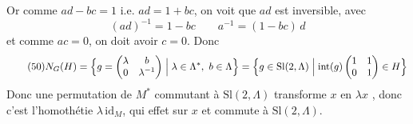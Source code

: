 \documentclass[11pt,a4paper]{article}
\begin{document}
Or  comme $ad-bc=1$ i.e. $ad=1+bc$,
on voit que  $ad$ est inversible,
 avec
\[
(ad)^{-1} = 1-bc \qquad a^{-1} = (1-bc)\,d
\]
et comme $ac=0$, on doit avoir $c=0$.
Donc
\[
\tag{50}
N_G(H) = \Bigl\{ g = \begin{pmatrix} \lambda & b\\ 0 & \lambda^{-1}\end{pmatrix} \Bigm| \lambda\in\Lambda^{*},\ b\in\Lambda \Bigr\}
= \Bigl\{ g\in\mathrm{Sl}(2,\Lambda) \Bigm| \operatorname{int}(g)\begin{pmatrix} 1 & 1\\ 0 & 1\end{pmatrix}\in H \Bigr\}
\]
Donc une \struck{\ill{}} permutation de $M^{*}$
commutant à $\mathrm{Sl}(2,\Lambda)$ transforme $x$ en $\lambda x$ \add{($\lambda\in\Lambda^{*}$)},
donc c'est l'homothétie $\lambda\,\mathrm{id}_M$, qui   effet sur $x$ et commute
à $\mathrm{Sl}(2,\Lambda)$.
\end{document}
